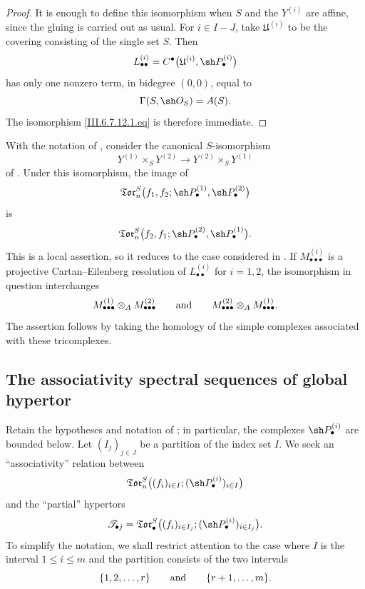 \begin{proof}
It is enough to define this isomorphism when $S$ and the
$Y^{(i)}$ are affine, since the gluing is carried out as usual.
For $i\in I-J$, take $\mathfrak U^{(i)}$ to be the covering
consisting of the single set $S$.  Then
\[
  L_{\bullet\bullet}^{(i)}
  =
  C^\bullet
  \bigl(
    \mathfrak U^{(i)},\sh P_\bullet^{(i)}
  \bigr)
\]
has only one nonzero term, in bidegree $(0,0)$, equal to
\[
  \Gamma(S,\sh O_S)=A(S).
\]
The isomorphism \eqref{III.6.7.12.1.eq} is therefore immediate.
\end{proof}

\begin{remark}[6.7.13]
\label{III.6.7.13}
With the notation of , consider the canonical
$S$-isomorphism
\[
  Y^{(1)}\times_SY^{(2)}
  \longrightarrow
  Y^{(2)}\times_SY^{(1)}
\]
of .  Under this isomorphism, the image of
\[
  \mathfrak{Tor}_n^S
  \bigl(
    f_1,f_2;
    \sh P_\bullet^{(1)},\sh P_\bullet^{(2)}
  \bigr)
\]
is
\[
  \mathfrak{Tor}_n^S
  \bigl(
    f_2,f_1;
    \sh P_\bullet^{(2)},\sh P_\bullet^{(1)}
  \bigr).
\]
This is a local assertion, so it reduces to the case considered in
.  If
$M_{\bullet\bullet\bullet}^{(i)}$ is a projective
Cartan--Eilenberg resolution of $L_{\bullet\bullet}^{(i)}$ for
$i=1,2$, the isomorphism in question interchanges
\[
  M_{\bullet\bullet\bullet}^{(1)}
  \otimes_A
  M_{\bullet\bullet\bullet}^{(2)}
  \qquad\hbox{and}\qquad
  M_{\bullet\bullet\bullet}^{(2)}
  \otimes_A
  M_{\bullet\bullet\bullet}^{(1)}.
\]
The assertion follows by taking the homology of the simple
complexes associated with these tricomplexes.
\end{remark}

\subsection{The associativity spectral sequences of global hypertor}
\label{subsection:III.6.8}
\label{III.6.8}

\begin{env}[6.8.1]
\label{III.6.8.1}
Retain the hypotheses and notation of ; in
particular, the complexes $\sh P_\bullet^{(i)}$ are bounded
below.  Let $(I_j)_{j\in J}$ be a partition of the index set $I$.
We seek an ``associativity'' relation between
\[
  \mathfrak{Tor}_n^S
  \bigl(
    (f_i)_{i\in I};
    (\sh P_\bullet^{(i)})_{i\in I}
  \bigr)
\]
and the ``partial'' hypertors
\[
  \mathcal T_{\bullet j}
  =
  \mathfrak{Tor}_\bullet^S
  \bigl(
    (f_i)_{i\in I_j};
    (\sh P_\bullet^{(i)})_{i\in I_j}
  \bigr).
\]
To simplify the notation, we shall restrict attention to the case
where $I$ is the interval $1\leq i\leq m$ and the partition
consists of the two intervals
\[
  \{1,2,\ldots,r\}
  \qquad\hbox{and}\qquad
  \{r+1,\ldots,m\}.
\]
\end{env}

